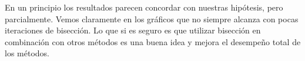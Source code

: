 En un principio los resultados parecen concordar con nuestras hipótesis, pero parcialmente. Vemos claramente en los gráficos que no siempre alcanza con pocas iteraciones de bisección. Lo que si es seguro es que utilizar bisección en combinación con otros métodos es una buena idea y mejora el desempeño total de los métodos.

